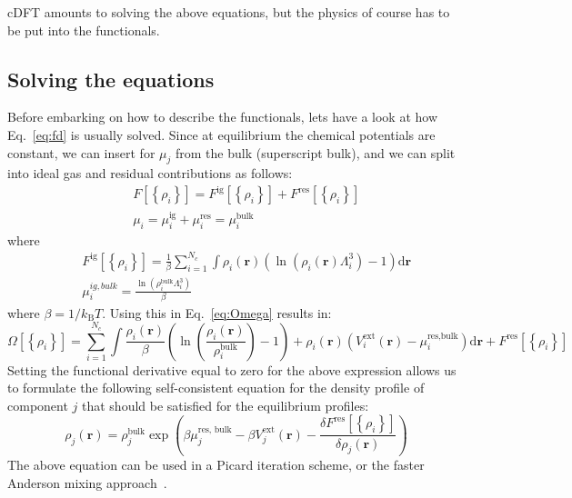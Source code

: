 \documentclass[12pt, letterpaper]{article}
\begin{document}
cDFT amounts to solving the above equations, but the physics of course has to be put into the functionals.

\subsection{Solving the equations}
Before embarking on how to describe the functionals, lets have a look at how Eq.~\ref{eq:fd} is usually solved. Since at equilibrium the chemical potentials are constant, we can insert for $\mu_j$ from the bulk (superscript bulk), and we can split into ideal gas and residual contributions as follows:
\begin{eqnarray}
  &&F\left[\left\{\rho_i\right\}\right]=F^{\text{ig}}\left[\left\{\rho_i\right\}\right]+F^{\text{res}}\left[\left\{\rho_i\right\}\right]\\
  &&\mu_i=\mu_i^{\text{ig}}+\mu_i^{\text{res}}=\mu_i^{\text{bulk}}
\end{eqnarray}
where
\begin{eqnarray}
&& F^{\text{ig}}\left[\left\{\rho_i\right\}\right]=\frac{1}{\beta}\sum_{i=1}^{N_c}\int\rho_i\left(\mathbf{r}\right)\left(\ln{\left(\rho_i\left(\mathbf{r}\right)\Lambda_i^3\right)}-1 \right)\text{d}\mathbf{r} \\
&&\mu_i^{ig,bulk}=\frac{\ln{\left(\rho_i^{\text{bulk}}\Lambda_i^3\right)}}{\beta}
\end{eqnarray}
where $\beta=1/k_{\text{B}}T$. Using this in Eq.~\ref{eq:Omega} results in:
\begin{equation}
  \Omega\left[\left\{\rho_i\right\}\right]=\sum_{i=1}^{N_c}\int\frac{\rho_i\left(\mathbf{r}\right)}{\beta}\left(\ln{\left(\frac{\rho_i\left(\mathbf{r}\right)}{\rho_i^{\text{bulk}}}\right)}-1 \right)+\rho_i\left(\mathbf{r}\right)\left(V_i^{\text{ext}}\left(\mathbf{r}\right)-\mu_i^{\text{res,bulk}}\right)\text{d}\mathbf{r}+F^{\text{res}}\left[\left\{\rho_i\right\}\right]
\end{equation}
Setting the functional derivative equal to zero for the above expression allows us to formulate the following self-consistent equation for the density profile of component $j$ that should be satisfied for the equilibrium profiles:
\begin{equation}
  \rho_j\left(\mathbf{r}\right)=\rho_j^{\text{bulk}}\exp{\left(\beta\mu_j^{\text{res, bulk}}-\beta V_j^{\text{ext}}\left(\mathbf{r}\right)-\frac{\delta F^{\text{res}}\left[\left\{\rho_i\right\}\right]}{\delta\rho_j\left(\mathbf{r}\right)}\right)}
  \label{eq:sol}
\end{equation}
The above equation can be used in a Picard iteration scheme, or the faster Anderson mixing approach~\cite{mairhofer2017}.
\end{document}
